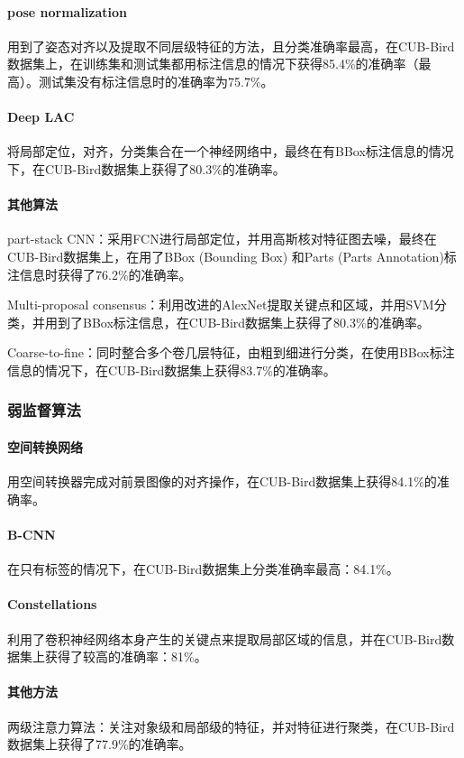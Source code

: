 \documentclass[UTF8]{article}
\begin{document}
\paragraph{pose normalization}
用到了姿态对齐以及提取不同层级特征的方法，且分类准确率最高，在CUB-Bird数据集上，在训练集和测试集都用标注信息的情况下获得85.4\%的准确率（最高）。测试集没有标注信息时的准确率为75.7\%。

\paragraph{Deep LAC}
将局部定位，对齐，分类集合在一个神经网络中，最终在有BBox标注信息的情况下，在CUB-Bird数据集上获得了80.3\%的准确率。
\paragraph{其他算法}

part-stack CNN：采用FCN进行局部定位，并用高斯核对特征图去噪，最终在CUB-Bird数据集上，在用了BBox (Bounding Box) 和Parts (Parts Annotation)标注信息时获得了76.2\%的准确率。

Multi-proposal consensus：利用改进的AlexNet提取关键点和区域，并用SVM分类，并用到了BBox标注信息，在CUB-Bird数据集上获得了80.3\%的准确率。

Coarse-to-fine：同时整合多个卷几层特征，由粗到细进行分类，在使用BBox标注信息的情况下，在CUB-Bird数据集上获得83.7\%的准确率。
\subsubsection{弱监督算法}

\paragraph{空间转换网络}
用空间转换器完成对前景图像的对齐操作，在CUB-Bird数据集上获得84.1\%的准确率。

\paragraph{B-CNN}
在只有标签的情况下，在CUB-Bird数据集上分类准确率最高：84.1\%。

\paragraph{Constellations}
利用了卷积神经网络本身产生的关键点来提取局部区域的信息，并在CUB-Bird数据集上获得了较高的准确率：81\%。


\paragraph{其他方法}
两级注意力算法：关注对象级和局部级的特征，并对特征进行聚类，在CUB-Bird数据集上获得了77.9\%的准确率。
\end{document}
